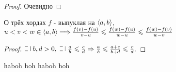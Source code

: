 \begin{proof}
    Очевидно
\end{proof}

\begin{namedlemma}{О трёх хордах} 
    $f$ - выпуклая на $\left\langle {a, b} \right\rangle$, $u < v < w \in \left\langle {a, b} \right\rangle \Longrightarrow \\ \frac{f(v) - f(u)}{v - u} \leqslant \frac{f(w) - f(u)}{w - u} \leqslant \frac{f(w) - f(v)}{w - v} $
\end{namedlemma}

\begin{proof}
    $\letus\; b, d > 0, \; \letus \; \frac{a}{b} \leqslant \frac{c}{d} \Rightarrow \frac{a}{b} \leqslant \frac{a + c}{b + d} \leqslant \frac{c}{d}$.
\end{proof}


haboh boh
haboh boh